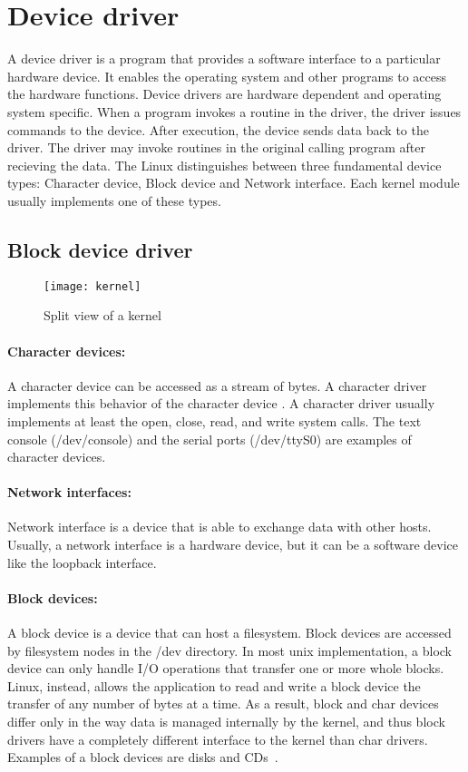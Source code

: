 \section{Device driver}
A device driver is a program that provides a software interface to a particular hardware device. It enables the operating system and other programs to access the hardware functions. Device drivers are hardware dependent and operating system specific. When a program invokes a routine in the driver, the driver issues commands to the device. After execution, the device sends data back to the driver. The driver may invoke routines in the original calling program after recieving the data. The Linux distinguishes between three fundamental device types: Character device, Block device and Network interface. Each kernel module usually implements one of these types.
\subsection{Block device driver}
\begin{figure}[!ht]
\centering
\texttt{[image: kernel]}
\caption{Split view of a kernel}
\label{fig:kernel}
\end{figure}
\paragraph{Character devices:} A character device can be accessed as a stream of bytes. A character driver implements this behavior of the character device . A character driver usually implements at least the open, close, read, and write system calls. The text console (/dev/console) and the serial ports (/dev/ttyS0) are examples of character devices.

\paragraph{Network interfaces:} Network interface is a device that is able to exchange data with other hosts. Usually, a network interface is a hardware device, but it can be a software device like the loopback interface. 

\paragraph{Block devices:} A block device is a device that can host a filesystem. Block devices are accessed by filesystem nodes in the /dev directory.  In most unix implementation, a block device can only handle I/O operations that transfer one or more whole blocks. Linux, instead, allows the application to read and write a block device the transfer of any number of bytes at a time. As a result, block and char devices differ only in the way data is managed internally by the kernel, and thus block drivers have a completely different interface to the kernel than char drivers. Examples of a block devices are disks and CDs~\cite{Corbet:2005:LDD:1209083}.

